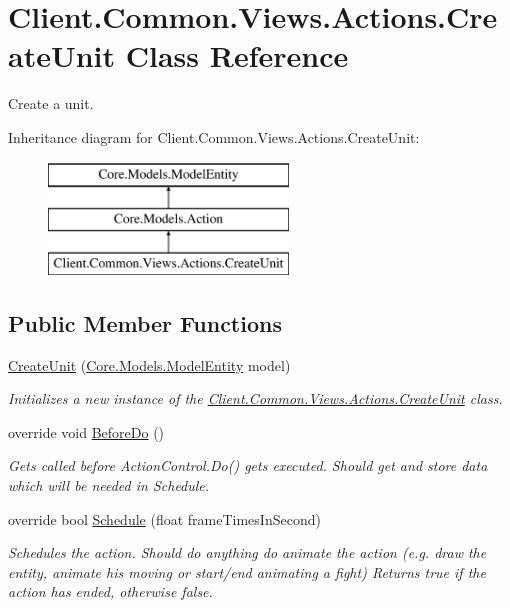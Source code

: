 \hypertarget{classClient_1_1Common_1_1Views_1_1Actions_1_1CreateUnit}{}\section{Client.\+Common.\+Views.\+Actions.\+Create\+Unit Class Reference}
\label{classClient_1_1Common_1_1Views_1_1Actions_1_1CreateUnit}


Create a unit.  


Inheritance diagram for Client.\+Common.\+Views.\+Actions.\+Create\+Unit\+:\begin{figure}[H]
\begin{center}
\leavevmode
\includegraphics[height=3.000000cm]{classClient_1_1Common_1_1Views_1_1Actions_1_1CreateUnit}
\end{center}
\end{figure}
\subsection*{Public Member Functions}
\begin{DoxyCompactItemize}
\item 
\hyperlink{classClient_1_1Common_1_1Views_1_1Actions_1_1CreateUnit_a4bbc3eb3130b3fdb43877133acb5541e}{Create\+Unit} (\hyperlink{classCore_1_1Models_1_1ModelEntity}{Core.\+Models.\+Model\+Entity} model)
\begin{DoxyCompactList}\small\item\em Initializes a new instance of the \hyperlink{classClient_1_1Common_1_1Views_1_1Actions_1_1CreateUnit}{Client.\+Common.\+Views.\+Actions.\+Create\+Unit} class. \end{DoxyCompactList}\item 
override void \hyperlink{classClient_1_1Common_1_1Views_1_1Actions_1_1CreateUnit_a651d26ad176e10a51065e513eec90aa8}{Before\+Do} ()
\begin{DoxyCompactList}\small\item\em Gets called before Action\+Control.\+Do() gets executed. Should get and store data which will be needed in Schedule. \end{DoxyCompactList}\item 
override bool \hyperlink{classClient_1_1Common_1_1Views_1_1Actions_1_1CreateUnit_a3b0aeac3eabb7b10b3f8fb287bc96181}{Schedule} (float frame\+Times\+In\+Second)
\begin{DoxyCompactList}\small\item\em Schedules the action. Should do anything do animate the action (e.\+g. draw the entity, animate his moving or start/end animating a fight) Returns true if the action has ended, otherwise false. \end{DoxyCompactList}\end{DoxyCompactItemize}
